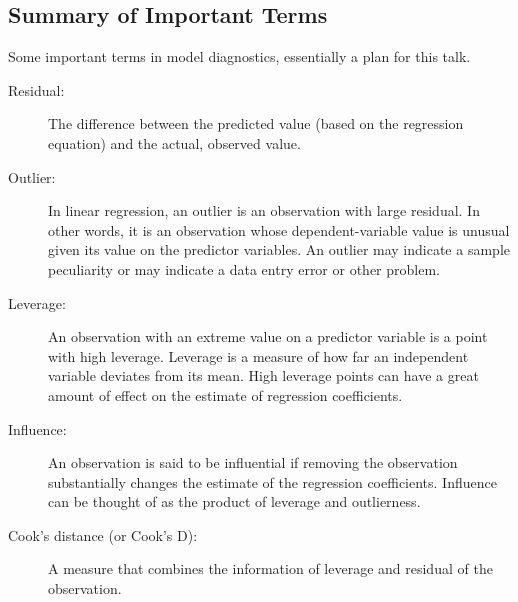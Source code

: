 \documentclass[residuals.tex]{subfiles}
\begin{document}
\newpage
\subsection*{Summary of Important Terms}
Some important terms in model diagnostics, essentially a plan for this talk.
\begin{description}
	\item[Residual: ] The difference between the predicted value (based on the regression equation) and the actual, observed value.
	\item[Outlier:]  In linear regression, an outlier is an observation with large residual.  In other words, it is an observation whose dependent-variable value is unusual given its value on the predictor variables.  An outlier may indicate a sample peculiarity or may indicate a data entry error or other problem. 
	\item[Leverage:]  An observation with an extreme value on a predictor variable is a point with high leverage.  Leverage is a measure of how far an independent variable deviates from its mean.  High leverage points can have a great amount of effect on the estimate of regression coefficients. 
	\item[Influence:]  An observation is said to be influential if removing the observation substantially changes the estimate of the regression coefficients.  Influence can be thought of as the product of leverage and outlierness.  
	\item[Cook's distance (or Cook's D):] A measure that combines the information of leverage and residual of the observation.  
\end{description}
\newpage
\end{document}
